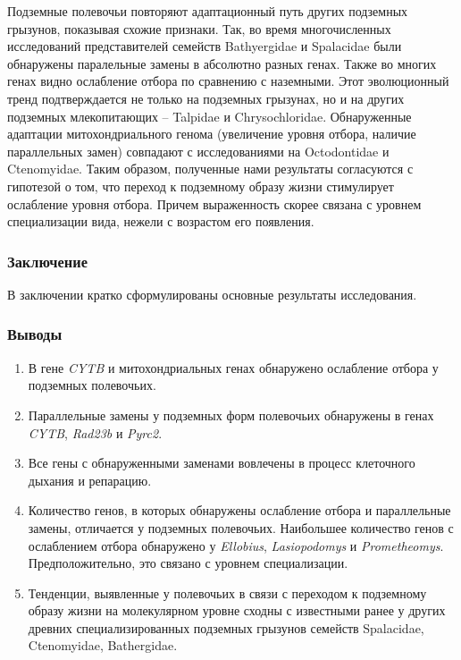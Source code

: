 Подземные полевочьи повторяют адаптационный путь других подземных грызунов, показывая схожие признаки. Так, во время многочисленных исследований представителей семейств Bathyergidae и  Spalacidae были обнаружены паралельные замены в абсолютно разных генах. Также во многих генах видно ослабление отбора по сравнению с наземными. Этот эволюционный тренд подтверждается не только на подземных грызунах, но и на других подземных млекопитающих --  Talpidae и Chrysochloridae. Обнаруженные адаптации митохондриального генома (увеличение уровня отбора, наличие параллельных замен) совпадают с исследованиями на Octodontidae и Ctenomyidae. Таким образом, полученные нами результаты согласуются с гипотезой о том, что переход к подземному образу жизни стимулирует ослабление уровня отбора. Причем выраженность скорее связана с уровнем специализации вида, нежели с возрастом его появления.


\subsubsection*{Заключение}
В заключении кратко сформулированы основные результаты исследования.

\subsubsection*{Выводы}

\begin{enumerate}
	
	\item В гене \textit{CYTB} и митохондриальных генах обнаружено ослабление отбора у подземных полевочьих. 
	
	\item Параллельные замены у подземных форм полевочьих обнаружены в генах \textit{CYTB}, \textit{Rad23b} и \textit{Pyrc2}.
	
	\item Все гены с обнаруженными заменами вовлечены в процесс клеточного дыхания и репарацию.  
	
	\item Количество генов, в которых обнаружены ослабление отбора и параллельные замены, отличается у подземных полевочьих. Наибольшее количество генов с ослаблением отбора обнаружено у \textit{Ellobius}, \textit{Lasiopodomys} и \textit{Prometheomys}. Предположительно, это связано с уровнем специализации.
	
	\item Тенденции, выявленные у полевочьих в связи с переходом к подземному образу жизни на молекулярном уровне сходны с известными ранее у других древних специализированных подземных грызунов семейств Spalacidae, Ctenomyidae, Bathergidae.
	
\end{enumerate}


